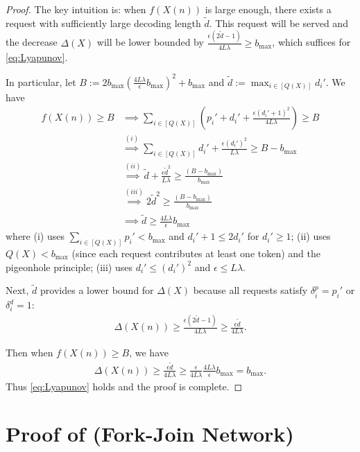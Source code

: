 \documentclass[11pt]{article}
\theoremstyle{plain}
\theoremstyle{definition}
\theoremstyle{remark}
\begin{document}
\begin{proof}
The key intuition is: when $f(X(n))$ is large enough, there exists a request with sufficiently large decoding length $\tilde{d}$. This request will be served and the decrease $\Delta(X)$ will be lower bounded by $\frac{\epsilon(2\tilde{d}-1)}{4L\lambda} \geq b_{\max}$, which suffices for \cref{eq:Lyapunov}.

In particular, let $B := 2b_{\max}\left(\frac{4L\lambda}{\epsilon}b_{\max} \right)^2 + b_{\max}$ and $\tilde{d} := \max_{i \in [Q(X)]} d_i'.$ We have
\begin{align*}
f(X(n)) \geq B
&\implies \sum_{i \in [Q(X)]}  \left(p_{i}' + d_{i}' + \frac{\epsilon (d_i'+1)^2}{4L\lambda}\right) \geq B\\
&\overset{(i)}{\implies}  \sum_{i \in [Q(X)]}  d_{i}' + \frac{\epsilon (d_i')^2}{L\lambda} \geq B - b_{\max}\\
&\overset{(ii)}{\implies} \tilde{d} + \frac{\epsilon \tilde{d}^2}{L\lambda} \geq \frac{(B-b_{\max})}{b_{\max}}\\
&\overset{(iii)}{\implies} 2\tilde{d}^2 \geq \frac{(B-b_{\max})}{b_{\max}}\\
&\implies \tilde{d} \geq \frac{4L\lambda}{\epsilon} b_{\max}
\end{align*}
where (i) uses $\sum_{i \in [Q(X)]} p_{i}' < b_{\max}$ and $d_i'+1 \leq 2d_{i}'$ for $d_i'\geq 1$; (ii) uses $Q(X) < b_{\max}$ (since each request contributes at least one token) and the pigeonhole principle; (iii) uses $d_{i}' \leq (d_{i}')^2$ and $\epsilon \leq L\lambda$.

Next, $\tilde{d}$ provides a lower bound for $\Delta(X)$ because all requests satisfy $\delta_{i}^{p}=p_{i}'$ or $\delta_{i}^{d}=1$:
\begin{align*}
\Delta(X(n)) \geq   \frac{\epsilon (2\tilde{d}-1)}{4L\lambda} \geq \frac{\epsilon \tilde{d}}{4L\lambda}.
\end{align*}

Then when $f(X(n)) \geq B$, we have
\begin{align*}
  \Delta(X(n)) \geq  \frac{\epsilon \tilde{d}}{4L\lambda} \geq   \frac{\epsilon}{4L\lambda} \frac{4L\lambda}{\epsilon} b_{\max} = b_{\max}.
\end{align*}
Thus \cref{eq:Lyapunov} holds and the proof is complete.
\end{proof}




\section{Proof of  (Fork-Join Network)}
\label{sec:proof-fork-join}
\end{document}
